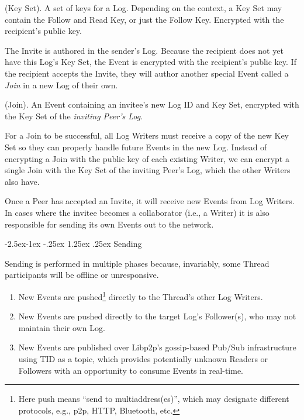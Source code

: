 \documentclass{textile}
\makeatletter
\renewcommand\paragraph{\@startsection{paragraph}{4}{\z@}%
            {-2.5ex\@plus -1ex \@minus -.25ex}%
            {1.25ex \@plus .25ex}%
            {\normalfont\normalsize\itshape}}
\makeatother
\begin{document}
\begin{definition}
(Key Set). A set of keys for a Log. Depending on the context, a Key Set may contain the Follow and Read Key, or just the Follow Key. Encrypted with the recipient's public key.
\end{definition}

The Invite is authored in the sender's Log. Because the recipient does not yet have this Log's Key Set, the Event is encrypted with the recipient's public key. If the recipient accepts the Invite, they will author another special Event called a \emph{Join} in a new Log of their own.

\begin{definition}
(Join). An Event containing an invitee's new Log ID and Key Set, encrypted with the Key Set of the \emph{inviting Peer's Log}.
\end{definition}

For a Join to be successful, all Log Writers must receive a copy of the new Key Set so they can properly handle future Events in the new Log. Instead of encrypting a Join with the public key of each existing Writer, we can encrypt a single Join with the Key Set of the inviting Peer's Log, which the other Writers also have.

Once a Peer has accepted an Invite, it will receive new Events from Log Writers.
In cases where the invitee becomes a collaborator (i.e., a Writer) it is also responsible for sending its own Events out to the network.

\paragraph{Sending}

Sending is performed in multiple phases because, invariably, some Thread participants will be offline or unresponsive. 

\begin{enumerate}
\item New Events are pushed\footnote{Here push means ``send to multiaddress(es)'', which may designate different protocols, e.g., p2p, HTTP, Bluetooth, etc.} directly to the Thread's other Log Writers.
\item New Events are pushed directly to the target Log's Follower(s), who may not maintain their own Log.
\item New Events are published over Libp2p's gossip-based Pub/Sub infrastructure using TID as a topic, which provides potentially unknown Readers or Followers with an opportunity to consume Events in real-time.
\end{enumerate}
\end{document}

